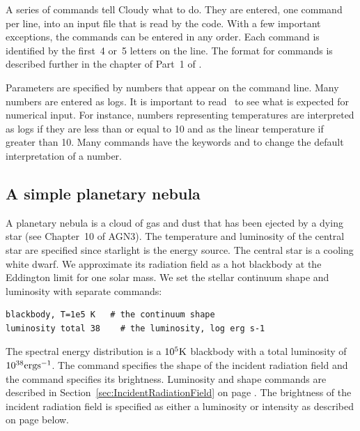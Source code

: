 \documentclass[12pt,twoside]{article}
\begin{document}
{A series of commands tell Cloudy what to do.
They are entered, one command per line,
into an input file that is read by the code.
With a few important
exceptions, the commands can be entered in any order.
Each command is
identified by the first~4 or~5 letters on the line.
The format for commands is described further in the
chapter  of Part~1 of \Hazy.

Parameters are specified by numbers that appear on the command line.
Many numbers are entered as logs.
It is important to read \Hazy\ to see what is
expected for numerical input.
For instance, numbers representing
temperatures are interpreted as logs if they are
less than or equal to 10 and as the linear
temperature if greater than 10.
Many commands have the keywords  and
 to change the default interpretation of a number.

\subsection{A simple planetary nebula}

A planetary nebula is a cloud of gas and dust that has been ejected by
a dying star (see Chapter~10 of AGN3).  The temperature and luminosity of
the central star are specified since starlight is the energy source.  The
central star is a cooling white dwarf.
We approximate its radiation field as a hot blackbody
at the Eddington limit for one solar mass.  We set the stellar continuum
shape and luminosity with separate commands:
\small
\begin{verbatim}
blackbody, T=1e5 K   # the continuum shape
luminosity total 38    # the luminosity, log erg s-1
\end{verbatim}
\normalsize
The spectral energy distribution is a $10^5 \rm{K}$ blackbody
with a total luminosity of $10^{38} \rm{erg s^{-1}}$.
The  command specifies the shape of the incident
radiation field and the  command
specifies its brightness.
Luminosity and shape commands are described in Section~\ref{sec:IncidentRadiationField}
on page \pageref{sec:IncidentRadiationField}.
The brightness of the incident radiation field is specified
as either a luminosity or intensity as described on
page \pageref{sec:LuminosityVsIntensityCases} below.

}
\end{document}
